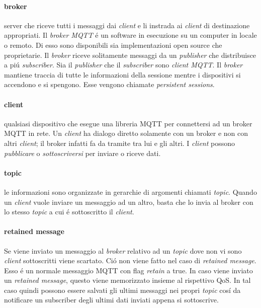 \paragraph{broker} server che riceve tutti i messaggi dai {\em client} e li instrada ai {\em client} di destinazione appropriati. Il {\em broker MQTT} \'e un software in esecuzione su un computer in locale o remoto. Di esso sono disponibili sia implementazioni open source che proprietarie. Il {\em broker} riceve solitamente messaggi da un {\em publisher} che distribuisce a pi\'u {\em subscriber}. Sia il {\em publisher} che il {\em subscriber} sono {\em client MQTT}. Il {\em broker} mantiene traccia di tutte le informazioni della sessione mentre i dispositivi si accendono e si spengono. Esse vengono chiamate {\em persistent sessions}.

\paragraph{client} qualsiasi dispositivo che esegue una libreria MQTT per connettersi ad un broker MQTT in rete. Un {\em client} ha dialogo diretto solamente con un broker e non con altri {\em client}; il broker infatti fa da tramite tra lui e gli altri. I {\em client} possono {\em pubblicare} o {\em sottoscriversi} per inviare o riceve dati.

\paragraph{topic} le informazioni sono organizzate in gerarchie di argomenti chiamati {\em topic}. Quando un {\em client} vuole inviare un messaggio ad un altro, basta che lo invia al broker con lo stesso {\em topic} a cui \'e sottoscritto il {\em client}. 

\paragraph{retained message} Se viene inviato un messaggio al {\em broker} relativo ad un {\em topic} dove non vi sono {\em client} sottoscritti viene scartato. Ci\'o non viene fatto nel caso di {\em retained message}. Esso \'e un normale messaggio MQTT con flag {\em retain} a true. In caso viene inviato un {\em retained message}, questo viene memorizzato insieme al rispettivo QoS. In tal caso quindi possono essere salvati gli ultimi messaggi nei propri {\em topic} cos\'i da notificare un subscriber degli ultimi dati inviati appena si sottoscrive.

